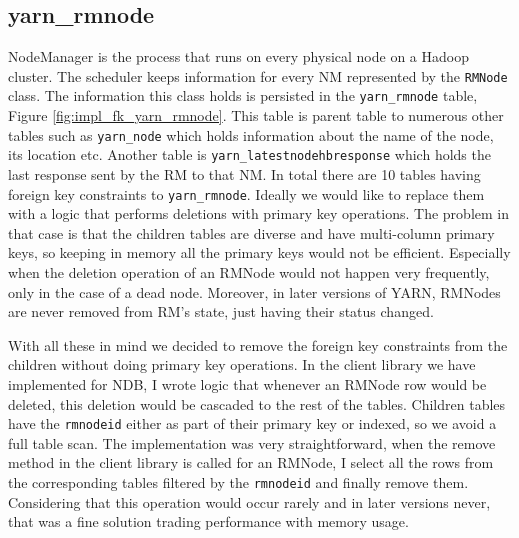 \subsection{yarn\_rmnode}
\label{ssec:impl_fk_rmnode}
NodeManager is the process that runs on every physical node on a
Hadoop cluster. The scheduler keeps information for every NM
represented by the \texttt{RMNode} class. The information this
class holds is persisted in the \texttt{yarn\_rmnode} table, Figure
\ref{fig:impl_fk_yarn_rmnode}. This table is parent table to
numerous other tables such as \texttt{yarn\_node} which holds
information about the name of the node, its location etc. Another
table is
\texttt{yarn\_latestnodehbresponse} which holds the last response sent
by the RM to that NM. In total there are 10 tables having foreign key
constraints to \texttt{yarn\_rmnode}. Ideally we would like to replace
them with a logic that performs deletions with primary key
operations. The problem in that case is that the children tables are
diverse and have multi-column primary keys, so keeping in memory all
the primary keys would not be efficient. Especially when the deletion
operation of an RMNode would not happen very frequently, only in the case
of a dead node. Moreover, in later versions of YARN, RMNodes are never
removed from RM's state, just having their status changed.

With all these in mind we decided to remove the foreign key
constraints from the children without doing primary key
operations. In the client library we have implemented for NDB,
I wrote logic that whenever an RMNode row would be deleted, this
deletion would be cascaded to the rest of the tables. Children tables
have the \texttt{rmnodeid} either as part of their primary key or indexed, so we
avoid a full table scan. The implementation was very straightforward,
when the remove method in the client library is called for an RMNode,
I select all the rows from the corresponding tables filtered by the
\texttt{rmnodeid} and finally remove them. Considering that this
operation would occur rarely and in later versions never, that was a
fine solution trading performance with memory usage.

